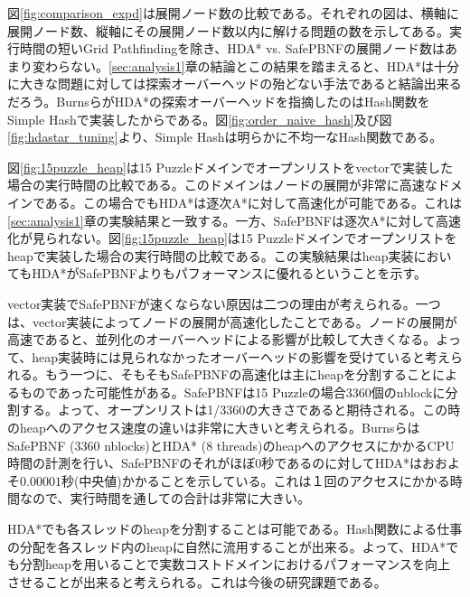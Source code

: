 \documentclass[uplatex]{jsarticle}
\begin{document}
図\ref{fig:comparison_expd}は展開ノード数の比較である。それぞれの図は、横軸に展開ノード数、縦軸にその展開ノード数以内に解ける問題の数を示してある。実行時間の短いGrid Pathfindingを除き、HDA* vs. SafePBNFの展開ノード数はあまり変わらない。\ref{sec:analysis1}章の結論とこの結果を踏まえると、HDA*は十分に大きな問題に対しては探索オーバーヘッドの殆どない手法であると結論出来るだろう。BurnsらがHDA*の探索オーバーヘッドを指摘したのはHash関数をSimple Hashで実装したからである。図\ref{fig:order_naive_hash}及び図\ref{fig:hdastar_tuning}より、Simple Hashは明らかに不均一なHash関数である。
\newline

図\ref{fig:15puzzle_heap}は15 Puzzleドメインでオープンリストをvectorで実装した場合の実行時間の比較である。このドメインはノードの展開が非常に高速なドメインである。この場合でもHDA*は逐次A*に対して高速化が可能である。これは\ref{sec:analysis1}章の実験結果と一致する。一方、SafePBNFは逐次A*に対して高速化が見られない。図\ref{fig:15puzzle_heap}は15 Puzzleドメインでオープンリストをheapで実装した場合の実行時間の比較である。この実験結果はheap実装においてもHDA*がSafePBNFよりもパフォーマンスに優れるということを示す。
\newline

vector実装でSafePBNFが速くならない原因は二つの理由が考えられる。一つは、vector実装によってノードの展開が高速化したことである。ノードの展開が高速であると、並列化のオーバーヘッドによる影響が比較して大きくなる。よって、heap実装時には見られなかったオーバーヘッドの影響を受けていると考えられる。もう一つに、そもそもSafePBNFの高速化は主にheapを分割することによるものであった可能性がある。SafePBNFは15 Puzzleの場合3360個のnblockに分割する。よって、オープンリストは1/3360の大きさであると期待される。この時のheapへのアクセス速度の違いは非常に大きいと考えられる。BurnsらはSafePBNF (3360 nblocks)とHDA* (8 threads)のheapへのアクセスにかかるCPU時間の計測を行い、SafePBNFのそれがほぼ0秒であるのに対してHDA*はおおよそ$0.00001$秒(中央値)かかることを示している\cite{Burns2010}。これは１回のアクセスにかかる時間なので、実行時間を通しての合計は非常に大きい。
\newline

HDA*でも各スレッドのheapを分割することは可能である。Hash関数による仕事の分配を各スレッド内のheapに自然に流用することが出来る。よって、HDA*でも分割heapを用いることで実数コストドメインにおけるパフォーマンスを向上させることが出来ると考えられる。これは今後の研究課題である。

\end{document}
